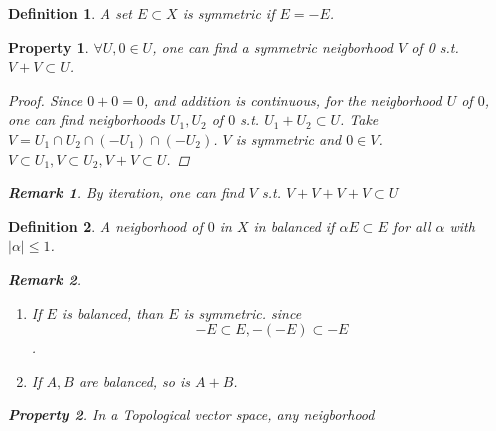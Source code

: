 \documentclass{article}
\newtheorem*{property}{Property}
\newtheorem*{definition}{Definition}
\newtheorem*{remark}{Remark}
\begin{document}
\begin{definition}
  A set $E \subset X$ is symmetric if $E = -E$.
\end{definition}
\begin{property}
  $\forall U, 0 \in U$, one can find a symmetric neigborhood $V$ of 0 s.t.
  $V + V \subset U$.
  \begin{proof}
    Since $0 + 0 = 0$, and addition is continuous, 
    for the neigborhood $U$ of $0$, one can find neigborhoods $U_1, U_2$
    of $0$ s.t. $U_1 + U_2 \subset U$. 
    Take $V = U_1 \cap U_2 \cap (-U_1) \cap (-U_2)$. 
    $V$ is symmetric and $0 \in V$. 
    $V \subset U_1, V \subset U_2, V + V \subset U$.
  \end{proof}
  \begin{remark}
    By iteration, one can find $V$ s.t. 
    $V + V + V + V \subset U$
  \end{remark}
\end{property}
\begin{definition}
  A neigborhood of $0$ in $X$ in balanced if $\alpha E \subset E$ for all $\alpha$ with $|\alpha| \le 1$.
  \begin{remark} \hfill
    \begin{enumerate}
      \item If $E$ is balanced, than $E$ is symmetric. since 
      \[-E \subset E, -(-E) \subset -E\].
      \item If $A, B$ are balanced, so is $A + B$.
    \end{enumerate}
  \end{remark}
  \begin{property}
    In a Topological vector space, any neigborhood 
  \end{property}
\end{definition}
\end{document}
